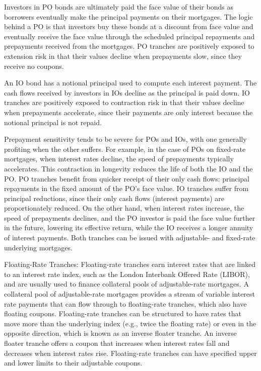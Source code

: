 \documentclass[11pt]{article}
\begin{document}
Investors in PO bonds are ultimately paid the face value of their bonds as borrowers eventually make the principal payments on their mortgages. The logic behind a PO is that investors buy these bonds at a discount from face value and eventually receive the face value through the scheduled principal repayments and prepayments received from the mortgages. PO tranches are positively exposed to extension risk in that their values decline when prepayments slow, since they receive no coupons.

An IO bond has a notional principal used to compute each interest payment. The cash flows received by investors in IOs decline as the principal is paid down. IO tranches are positively exposed to contraction risk in that their values decline when prepayments accelerate, since their payments are only interest because the notional principal is not repaid.

Prepayment sensitivity tends to be severe for POs and IOs, with one generally profiting when the other suffers. For example, in the case of POs on fixed-rate mortgages, when interest rates decline, the speed of prepayments typically accelerates. This contraction in longevity reduces the life of both the IO and the PO. PO tranches benefit from quicker receipt of their only cash flows: principal repayments in the fixed amount of the PO's face value. IO tranches suffer from principal reductions, since their only cash flows (interest payments) are proportionately reduced. On the other hand, when interest rates increase, the speed of prepayments declines, and the PO investor is paid the face value further in the future, lowering its effective return, while the IO receives a longer annuity of interest payments. Both tranches can be issued with adjustable- and fixed-rate underlying mortgages.

Floating-Rate Tranches: Floating-rate tranches earn interest rates that are linked to an interest rate index, such as the London Interbank Offered Rate (LIBOR), and are usually used to finance collateral pools of adjustable-rate mortgages. A collateral pool of adjustable-rate mortgages provides a stream of variable interest rate payments that can flow through to floating-rate tranches, which also have floating coupons. Floating-rate tranches can be structured to have rates that move more than the underlying index (e.g., twice the floating rate) or even in the opposite direction, which is known as an inverse floater tranche. An inverse floater tranche offers a coupon that increases when interest rates fall and decreases when interest rates rise. Floating-rate tranches can have specified upper and lower limits to their adjustable coupons.
\end{document}
